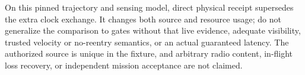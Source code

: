 \documentclass{article}
\begin{document}
On this pinned trajectory and sensing model, direct physical
receipt supersedes the extra clock exchange. It changes both
source and resource usage; do not generalize the comparison
to gates without that live evidence, adequate visibility, trusted
velocity or no-reentry semantics, or an actual guaranteed latency.
The authorized source is unique in the fixture, and arbitrary
radio content, in-flight loss recovery, or independent mission
acceptance are not claimed.
\end{document}
